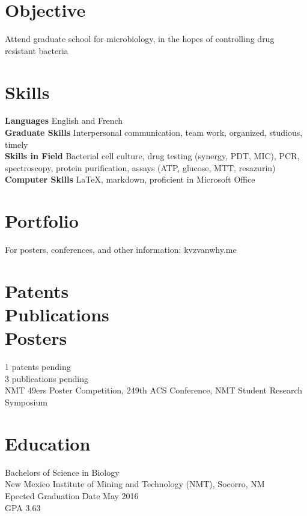 \documentclass[margin]{res}
\begin{document}
 
 
 
\address{Resume}


 
\begin{resume} 
 
\section{Objective} 
Attend graduate school for microbiology, in the hopes of controlling drug resistant bacteria

\section{Skills} 
  {\bf Languages} English and French \\
  {\bf Graduate Skills} Interpersonal communication, team work, organized, studious, timely\\
  {\bf Skills in Field} Bacterial cell culture, drug testing (synergy, PDT, MIC), PCR, spectroscopy, protein purification, assays (ATP, glucose, MTT, resazurin)\\ 
  {\bf Computer Skills} \LaTeX, markdown, proficient in Microsoft Office 
  
  \section{Portfolio}
  For posters, conferences, and other information: kvzvanwhy.me
  
  \section{Patents \\ Publications \\ Posters}
  1 patents pending \\ 3 publications pending \\ NMT 49ers Poster Competition, 249th ACS Conference, NMT Student Research Symposium

\section{Education} 
 Bachelors of Science in Biology\\
 New Mexico Institute of Mining and Technology (NMT), Socorro, NM\\
 Epected Graduation Date May 2016 \\
GPA 3.63
 


\end{resume}
\end{document}
